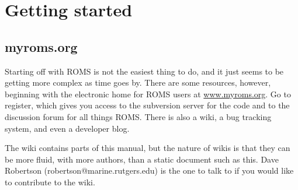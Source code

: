 \section{Getting started}
\label{Starting}

\subsection{myroms.org}
\label{Myroms}
Starting off with ROMS is not the easiest thing to do, and it just
seems to be getting more complex as time goes by. There are
some resources, however, beginning with the
electronic home for ROMS users at
\href{http://www.myroms.org}{www.myroms.org}. Go to register,
which gives you access to the subversion server for the code and to
the  discussion forum for all things ROMS. There is also a wiki,
a bug tracking system, and even a developer blog.

The wiki contains parts of this manual, but the nature of wikis is that
they can be more fluid, with more authors, than a static document such
as this. Dave Robertson (robertson@marine.rutgers.edu) is the one to
talk to if you would like to contribute to the wiki.


